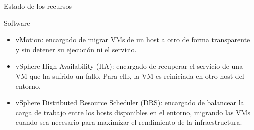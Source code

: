 \begin{chapter}{Estado de los recursos}
\begin{section}{Software}
    \begin{itemize}
        \item vMotion: encargado de migrar VMs de un host a otro de forma transparente y sin detener su ejecución ni el servicio.
        
        \item vSphere High Availability (HA): encargado de recuperar el servicio de una VM que ha sufrido un fallo. Para ello, la VM es reiniciada en otro host del entorno.
        
        \item vSphere Distributed Resource Scheduler (DRS): encargado de balancear la carga de trabajo entre los hosts disponibles en el entorno, migrando las VMs cuando sea necesario para maximizar el rendimiento de la infraestructura. 
        
        
    \end{itemize}
\end{section}


\end{chapter}
